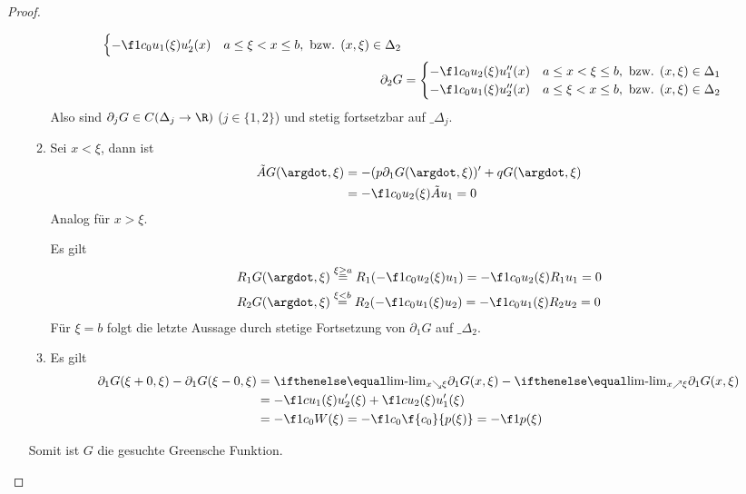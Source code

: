 \begin{st}
\begin{proof}
\begin{seg}[(ii)$\implies$(i)]
\begin{itemize}
\begin{enumerate}[1)]
\begin{align*}
\begin{cases}
									-\f 1{c_0} u_1(\xi) u_2'(x) & a \le \xi < x \le b, \text{ bzw. $(x,\xi) \in \Delta_2$} 
								\end{cases} \\
								\partial_2 G &= \begin{cases}
									-\f 1{c_0} u_2(\xi) u_1''(x) & a \le x < \xi \le b, \text{ bzw. $(x,\xi) \in \Delta_1$} \\
									-\f 1{c_0} u_1(\xi) u_2''(x) & a \le \xi < x \le b, \text{ bzw. $(x,\xi) \in \Delta_2$} 
								\end{cases}
							\end{align*}
							Also sind $\partial_j G \in C(\Delta_j \to \R)$ ($j\in \{1,2\}$) und stetig fortsetzbar auf $\_{\Delta_j}$.
						\item
							Sei $x < \xi$, dann ist
							\begin{align*}
								\tilde A G(\argdot, \xi) 
								&= -(p\partial_1 G(\argdot, \xi))' + qG(\argdot, \xi)  \\
								&= - \f 1{c_0} u_2(\xi) \tilde A u_1 
								= 0
							\end{align*}
							Analog für $x > \xi$.

							Es gilt
							\begin{align*}
								R_1 G(\argdot, \xi) &\stackrel{\xi \ge a}= R_1 (-\f 1{c_0} u_2(\xi) u_1) = -\f 1{c_0} u_2(\xi) R_1u_1 = 0 \\
								R_2 G(\argdot, \xi) &\stackrel{\xi < b}= R_2 (-\f 1{c_0} u_1(\xi) u_2) = -\f 1{c_0} u_1(\xi) R_2u_2 = 0
							\end{align*}
							Für $\xi = b$ folgt die letzte Aussage durch stetige Fortsetzung von $\partial_1 G $ auf $\_{\Delta_2}$.
						\item
							Es gilt
							\begin{align*}
								\partial_1 G(\xi + 0, \xi) - \partial_1 G(\xi - 0, \xi)
								&= \lim_{x \searrow \xi} \partial_1 G(x, \xi) - \lim_{x \nearrow \xi} \partial_1 G(x,\xi) \\
								&= - \f 1{c} u_1(\xi) u_2'(\xi) + \f 1c u_2(\xi) u_1'(\xi) \\
								&= - \f 1{c_0} W(\xi)
								= - \f 1{c_0} \f {c_0}{p(\xi)} = - \f 1{p(\xi)}
							\end{align*}
					\end{enumerate}
					Somit ist $G$ die gesuchte Greensche Funktion.
			\end{itemize}
		\end{seg}
	\end{proof}
\end{st}


